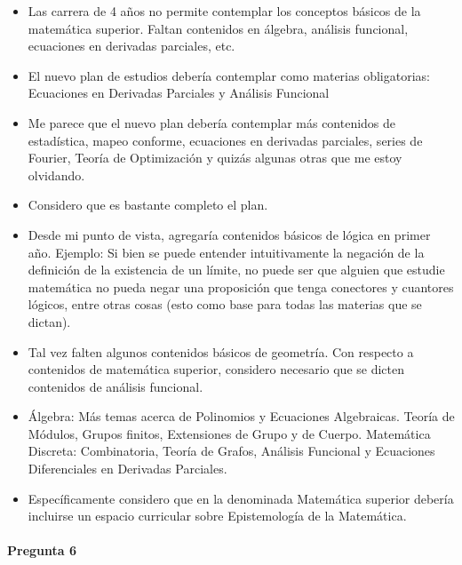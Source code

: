 \documentclass[a4paper,10pt,BCOR10mm,oneside,headsepline]{scrbook}
\begin{document}
\begin{subappendices}
\begin{itemize}
\item Las carrera de 4 años no permite contemplar los conceptos básicos de la matemática superior. Faltan contenidos en álgebra, análisis funcional, ecuaciones en derivadas parciales, etc.

\item El nuevo plan de estudios debería contemplar como materias obligatorias: Ecuaciones en Derivadas Parciales y Análisis Funcional

\item Me parece que el nuevo plan debería contemplar más contenidos de estadística, mapeo conforme, ecuaciones en derivadas parciales, series de Fourier, Teoría de Optimización y quizás algunas otras que me estoy olvidando.

\item Considero que es bastante completo el plan.

\item Desde mi punto de vista, agregaría contenidos básicos de lógica en primer año. Ejemplo: Si bien se puede entender intuitivamente la negación de la definición de la existencia de un límite, no puede ser que alguien que estudie matemática no pueda negar una proposición que tenga conectores y cuantores lógicos, entre otras cosas (esto como base para todas las materias que se dictan).

\item Tal vez falten algunos contenidos básicos de geometría. 
Con respecto a contenidos de matemática superior, considero necesario que se dicten contenidos de análisis funcional.

\item Álgebra: Más temas acerca de Polinomios y Ecuaciones Algebraicas. Teoría de Módulos, Grupos finitos, Extensiones de Grupo y de Cuerpo. Matemática Discreta: Combinatoria, Teoría de Grafos,  Análisis Funcional y Ecuaciones Diferenciales en Derivadas Parciales.

\item Específicamente considero que en la denominada Matemática superior debería incluirse un espacio curricular sobre Epistemología de la Matemática.
 \end{itemize}
 
 
 
  \paragraph{Pregunta 6}
\begin{center}
 

\end{center}
\end{subappendices}
\end{document}
